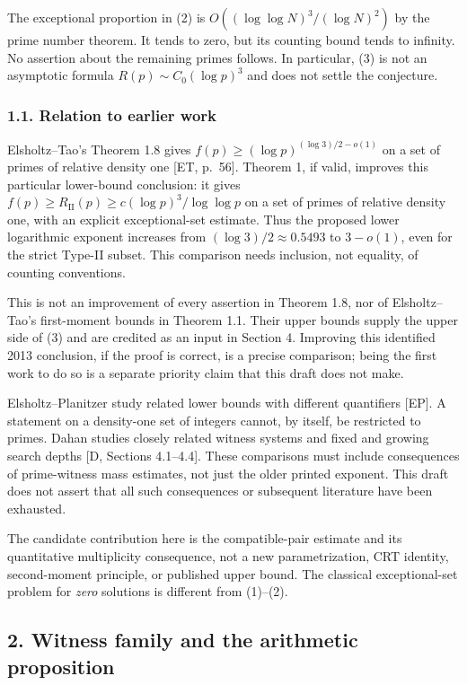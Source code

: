 \documentclass[
  english,
  11pt,
]{article}
\begin{document}
The exceptional proportion in (2) is \(O((\log\log N)^3/(\log N)^2)\) by
the prime number theorem. It tends to zero, but its counting bound tends
to infinity. No assertion about the remaining primes follows. In
particular, (3) is not an asymptotic formula \(R(p)\sim C_0(\log p)^3\)
and does not settle the conjecture.

\subsubsection{1.1. Relation to earlier
work}\label{relation-to-earlier-work}

Elsholtz--Tao's Theorem 1.8 gives \(f(p)\ge(\log p)^{(\log 3)/2-o(1)}\)
on a set of primes of relative density one {[}ET, p.~56{]}. Theorem 1,
if valid, improves this particular lower-bound conclusion: it gives
\(f(p)\ge R_{\mathrm{II}}(p)\ge c(\log p)^3/\log\log p\) on a set of
primes of relative density one, with an explicit exceptional-set
estimate. Thus the proposed lower logarithmic exponent increases from
\((\log 3)/2\approx0.5493\) to \(3-o(1)\), even for the strict Type-II
subset. This comparison needs inclusion, not equality, of counting
conventions.

This is not an improvement of every assertion in Theorem 1.8, nor of
Elsholtz--Tao's first-moment bounds in Theorem 1.1. Their upper bounds
supply the upper side of (3) and are credited as an input in Section 4.
Improving this identified 2013 conclusion, if the proof is correct, is a
precise comparison; being the first work to do so is a separate priority
claim that this draft does not make.

Elsholtz--Planitzer study related lower bounds with different
quantifiers {[}EP{]}. A statement on a density-one set of integers
cannot, by itself, be restricted to primes. Dahan studies closely
related witness systems and fixed and growing search depths {[}D,
Sections 4.1--4.4{]}. These comparisons must include consequences of
prime-witness mass estimates, not just the older printed exponent. This
draft does not assert that all such consequences or subsequent
literature have been exhausted.

The candidate contribution here is the compatible-pair estimate and its
quantitative multiplicity consequence, not a new parametrization, CRT
identity, second-moment principle, or published upper bound. The
classical exceptional-set problem for \emph{zero} solutions is different
from (1)--(2).

\subsection{2. Witness family and the arithmetic
proposition}\label{witness-family-and-the-arithmetic-proposition}
\end{document}
